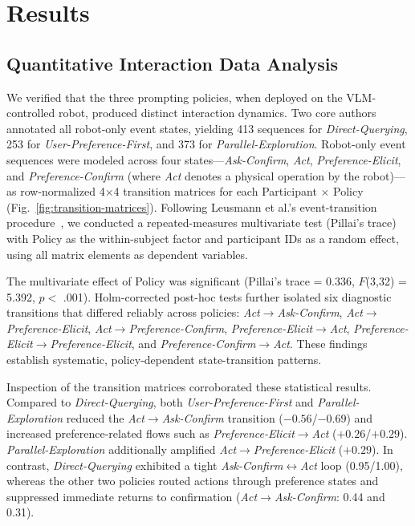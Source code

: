 \documentclass[sigconf,authordraft]{acmart}
\begin{document}
\section{Results}

\subsection{Quantitative Interaction Data Analysis}
We verified that the three prompting policies, when deployed on the VLM-controlled robot, produced distinct interaction dynamics. Two core authors annotated all robot-only event states, yielding 413 sequences for \textit{Direct-Querying}, 253 for \textit{User-Preference-First}, and 373 for \textit{Parallel-Exploration}. Robot-only event sequences were modeled across four states—\textit{Ask-Confirm}, \textit{Act}, \textit{Preference-Elicit}, and \textit{Preference-Confirm} (where \textit{Act} denotes a physical operation by the robot)—as row-normalized 4$\times$4 transition matrices for each Participant $\times$ Policy (Fig.~\ref{fig:transition-matrices}). Following Leusmann et al.’s event-transition procedure~\cite{conf/chi/LeusmannVB0M25}, we conducted a repeated-measures multivariate test (Pillai’s trace) with Policy as the within-subject factor and participant IDs as a random effect, using all matrix elements as dependent variables.  

The multivariate effect of Policy was significant (Pillai’s trace = 0.336, $F$(3,32) = 5.392, $p <$ .001). Holm-corrected post-hoc tests further isolated six diagnostic transitions that differed reliably across policies: \textit{Act$\rightarrow$Ask-Confirm}, \textit{Act$\rightarrow$Preference-Elicit}, \textit{Act$\rightarrow$Preference-Confirm}, \textit{Preference-Elicit$\rightarrow$Act}, \textit{Preference-Elicit$\rightarrow$Preference-Elicit}, and \textit{Preference-Confirm$\rightarrow$Act}. These findings establish systematic, policy-dependent state-transition patterns.  

Inspection of the transition matrices corroborated these statistical results. Compared to \textit{Direct-Querying}, both \textit{User-Preference-First} and \textit{Parallel-Exploration} reduced the \textit{Act$\rightarrow$Ask-Confirm} transition ($-0.56$/$-0.69$) and increased preference-related flows such as \textit{Preference-Elicit$\rightarrow$Act} ($+0.26$/$+0.29$). \textit{Parallel-Exploration} additionally amplified \textit{Act$\rightarrow$Preference-Elicit} ($+0.29$). In contrast, \textit{Direct-Querying} exhibited a tight \textit{Ask-Confirm$\leftrightarrow$Act} loop (0.95/1.00), whereas the other two policies routed actions through preference states and suppressed immediate returns to confirmation (\textit{Act$\rightarrow$Ask-Confirm}: 0.44 and 0.31).  
\end{document}
